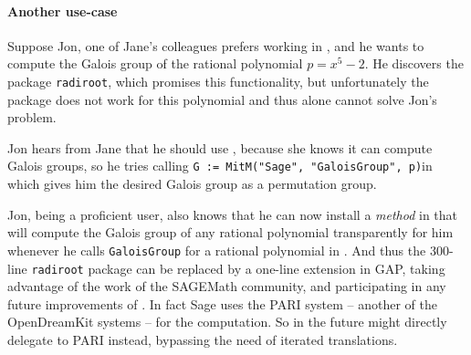 \paragraph{Another use-case}

Suppose Jon, one of Jane's colleagues prefers working in \GAP, and he wants to compute the Galois group of the rational polynomial $p = x^5 - 2$.
He discovers the \GAP package \texttt{radiroot}, which promises this functionality, but unfortunately the package does not work for this polynomial and thus \GAP alone cannot solve Jon's problem.

Jon hears from Jane that he should use \Sage, because she knows it can compute Galois groups, so he tries calling \lstinline|G := MitM("Sage", "GaloisGroup", p)|in \GAP which gives him the desired Galois group as a \GAP permutation group. 

Jon, being a proficient \GAP user, also knows that he can now install a \emph{method} in \GAP that will compute the Galois group of any rational polynomial transparently for him whenever he calls \lstinline|GaloisGroup| for a rational polynomial in \GAP. 
And thus the 300-line \lstinline|radiroot| package can be replaced by a one-line extension in GAP, taking advantage of the work of the SAGEMath community, and participating in any future improvements of \Sage. In fact Sage uses the PARI system -- another of the OpenDreamKit systems -- for the computation. 
So in the future \GAP might directly delegate to PARI instead, bypassing the need of iterated translations.  



